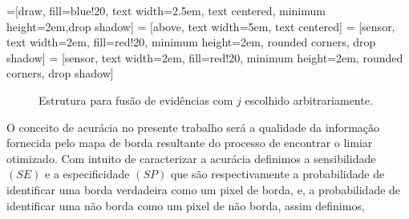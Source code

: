 =[draw, fill=blue!20, text width=2.5em, 
    text centered, minimum height=2em,drop shadow]
 = [above, text width=5em, text centered]
 = [sensor, text width=2em, fill=red!20, 
    minimum height=2em, rounded corners, drop shadow]
 = [sensor, text width=2em, fill=red!20, 
    minimum height=2em, rounded corners, drop shadow]

\begin{figure}[hbt!]
\centering
{}
\caption{Estrutura para fusão de evidências com $j$ escolhido arbitrariamente.}
\label{cap_fusao_fig02}
\end{figure}

O conceito de acurácia no presente trabalho será a qualidade da informação fornecida pelo mapa de borda resultante do processo de encontrar o limiar otimizado. 
Com intuito de caracterizar a acurácia definimos a sensibilidade $(SE)$ e a especificidade $(SP)$ que são respectivamente a probabilidade de identificar uma borda verdadeira como um pixel de borda, e, a probabilidade de identificar uma não borda como um pixel de não borda, assim definimos, 

